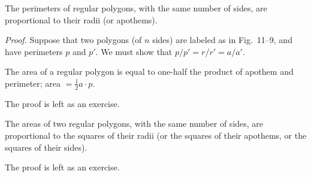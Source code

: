 \documentclass[11pt]{book}
\theoremstyle{bkplain}
\theoremstyle{XIplainnote}
\theoremstyle{bkplain}
\theoremstyle{bkplain}
\begin{document}
\FIGXIEIGHTNINE

\begin{theorem}
The perimeters of regular polygons, with the same number of sides, are
proportional to their radii (or apothems).
\end{theorem}

\noindent\emph{Proof.} Suppose that two polygons (of $n$ sides) are labeled as
in Fig.~11--9, and have perimeters $p$ and $p'$. We must show that
$p/p' = r/r' = a/a'$.

\begin{steps}
\end{steps}

\begin{theorem}
The area of a regular polygon is equal to one-half the product of apothem and
perimeter; area $= \frac{1}{2}a \cdot p$.
\end{theorem}

\noindent The proof is left as an exercise.

\begin{theorem}
The areas of two regular polygons, with the same number of sides, are
proportional to the squares of their radii (or the squares of their apothems,
or the squares of their sides).
\end{theorem}

\noindent The proof is left as an exercise.
\end{document}
